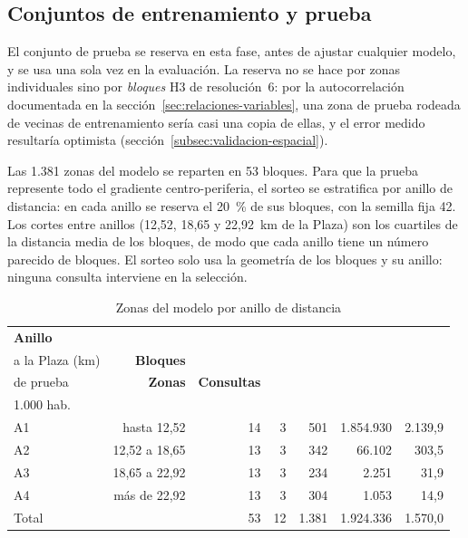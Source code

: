 \subsection{Conjuntos de entrenamiento y prueba}
\label{sec:conjuntos-entrenamiento-prueba}

El conjunto de prueba se reserva en esta fase, antes de ajustar cualquier modelo, y se usa
una sola vez en la evaluación. La reserva no se hace por zonas individuales sino por
\emph{bloques} H3 de resolución~6: por la autocorrelación documentada en la
sección~\ref{sec:relaciones-variables}, una zona de prueba rodeada de vecinas de
entrenamiento sería casi una copia de ellas, y el error medido resultaría optimista
(sección~\ref{subsec:validacion-espacial}).

Las 1.381 zonas del modelo se reparten en 53 bloques. Para que la prueba represente todo el
gradiente centro-periferia, el sorteo se estratifica por anillo de distancia: en cada
anillo se reserva el 20~\% de sus bloques, con la semilla fija 42. Los cortes entre anillos
(12,52, 18,65 y 22,92~km de la Plaza) son los cuartiles de la distancia media de los
bloques, de modo que cada anillo tiene un número parecido de bloques. El sorteo solo usa la
geometría de los bloques y su anillo: ninguna consulta interviene en la selección.

\begin{table}[H]
  \centering
  \caption{Zonas del modelo por anillo de distancia}
  \label{tab:anillos}
  \interlineadoSimple
  \small
  \begin{tabular}{@{}lrrrrrr@{}}
    \toprule
    \textbf{Anillo} & \textbf{\celda{Distancia\\a la Plaza (km)}} & \textbf{Bloques} & \textbf{\celda{Bloques\\de prueba}} & \textbf{Zonas} & \textbf{Consultas} & \textbf{\celda{Consultas por\\1.000 hab.}} \\
    \midrule
    A1 & hasta 12,52 & 14 & 3 & 501 & 1.854.930 & 2.139,9 \\
    A2 & 12,52 a 18,65 & 13 & 3 & 342 & 66.102 & 303,5 \\
    A3 & 18,65 a 22,92 & 13 & 3 & 234 & 2.251 & 31,9 \\
    A4 & más de 22,92 & 13 & 3 & 304 & 1.053 & 14,9 \\
    \midrule
    Total & & 53 & 12 & 1.381 & 1.924.336 & 1.570,0 \\
    \bottomrule
  \end{tabular}
\end{table}

